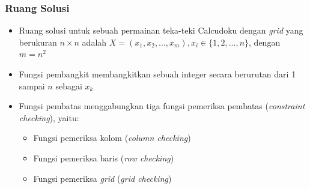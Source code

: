 \documentclass{beamer}
\begin{document}
\begin{frame}
\frametitle{Ruang Solusi}
\begin{itemize}
\item Ruang solusi untuk sebuah permainan teka-teki Calcudoku dengan \textit{grid} yang berukuran \begin{math}n \times n\end{math} adalah \begin{math}X = (x_1,x_2,...,x_m), x_i \in \{1,2,...,n\}\end{math}, dengan \begin{math}m = n^2\end{math}
\item Fungsi pembangkit membangkitkan sebuah integer secara berurutan dari 1 sampai \begin{math}n\end{math} sebagai \begin{math}x_k\end{math}
\item Fungsi pembatas menggabungkan tiga fungsi pemeriksa pembatas (\textit{constraint checking}), yaitu:
	\begin{itemize}
	\item Fungsi pemeriksa kolom (\textit{column checking})
	\item Fungsi pemeriksa baris (\textit{row checking})
	\item Fungsi pemeriksa \textit{grid} (\textit{grid checking})
	\end{itemize}
\end{itemize}
\end{frame}

\end{document}
